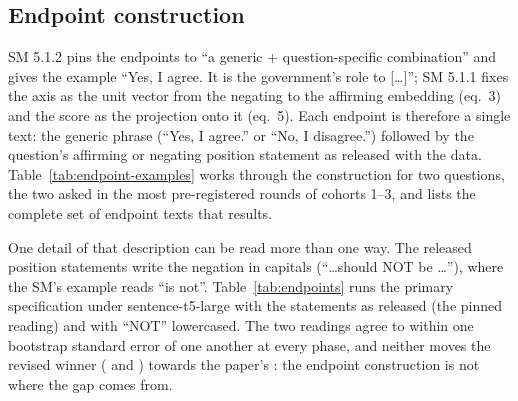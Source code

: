 \documentclass[11pt,a4paper]{article}
\begin{document}
\subsection*{Endpoint construction}
\label{sec:endpoints}

SM 5.1.2 pins the endpoints to ``a generic + question-specific combination'' and gives the
example ``Yes, I agree. It is the government's role to [\ldots]''; SM 5.1.1 fixes the axis as the
unit vector from the negating to the affirming embedding (eq.~3) and the score as the projection
onto it (eq.~5). Each endpoint is therefore a single text: the generic phrase (``Yes, I agree.'' or
``No, I disagree.'') followed by the question's affirming or negating position statement as
released with the data. Table~\ref{tab:endpoint-examples} works through the construction for two
questions, the two asked in the most pre-registered rounds of cohorts 1--3, and lists the complete
set of endpoint texts that results.

One detail of that description can be read more than one way. The released position
statements write the negation in capitals (``\ldots should NOT be \ldots''), where the SM's example
reads ``is not''. Table~\ref{tab:endpoints} runs the primary specification under sentence-t5-large
with the statements as released (the pinned reading) and with ``NOT'' lowercased. The two readings
agree to within one bootstrap standard error of one another at every phase, and neither moves the
revised winner (\axisPinnedRevWin{} and \axisNotLowerRevWin{}) towards the paper's \paperRevWin{}:
the endpoint construction is not where the gap comes from.
\end{document}

